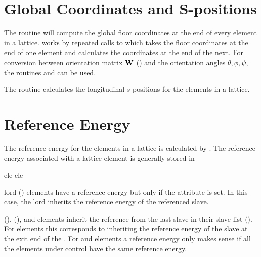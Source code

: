 {{{{{{{%
\section{Global Coordinates and S-positions}
\label{s:global.coords}

The routine  will compute the
global floor coordinates at the end of every element in a lattice.
 works by repeated calls to  which
takes the floor coordinates at the end of one element and calculates
the coordinates at the end of the next. For conversion between
orientation matrix ${\bf W}$ () and the orientation
angles $\theta, \phi, \psi$, the routines 
and  can be used.

The routine  calculates the longitudinal $s$ positions for
the elements in a lattice.

\section{Reference Energy}
\label{s:ref.energy}

The reference energy for the elements in a lattice is calculated by
.
The reference energy associated with a lattice element is generally stored in
\begin{example}
  ele%
  ele%
\end{example}

 lord () elements have a
reference energy but only if the  attribute is set. In
this case, the  lord inherits the reference energy of
the referenced slave.

 (),  (), and
 elements inherit the reference from the last slave in
their slave list (). For  elements
this corresponds to inheriting the reference energy of the slave at
the exit end of the . For  and 
elements a reference energy only makes sense if all the elements under
control have the same reference energy.

}}}}}}}
